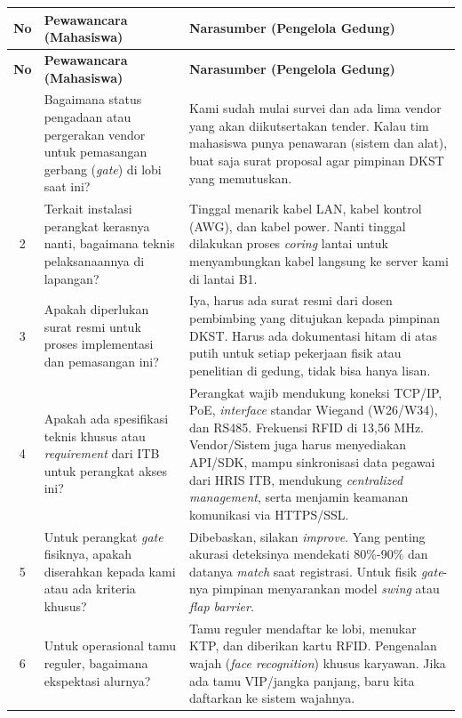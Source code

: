 \begin{longtable}{|c|p{}|p{}|}
\hline
\textbf{No} & \textbf{Pewawancara (Mahasiswa)} & \textbf{Narasumber (Pengelola Gedung)} \\ \hline
\endfirsthead
\hline
\textbf{No} & \textbf{Pewawancara (Mahasiswa)} & \textbf{Narasumber (Pengelola Gedung)} \\ \hline
\endhead
\hline
\endfoot
\hline
\endlastfoot
1 & Bagaimana status pengadaan atau pergerakan vendor untuk pemasangan gerbang (\textit{gate}) di lobi saat ini? & Kami sudah mulai survei dan ada lima vendor yang akan diikutsertakan tender. Kalau tim mahasiswa punya penawaran (sistem dan alat), buat saja surat proposal agar pimpinan DKST yang memutuskan. \\ \hline
2 & Terkait instalasi perangkat kerasnya nanti, bagaimana teknis pelaksanaannya di lapangan? & Tinggal menarik kabel LAN, kabel kontrol (AWG), dan kabel power. Nanti tinggal dilakukan proses \textit{coring} lantai untuk menyambungkan kabel langsung ke server kami di lantai B1. \\ \hline
3 & Apakah diperlukan surat resmi untuk proses implementasi dan pemasangan ini? & Iya, harus ada surat resmi dari dosen pembimbing yang ditujukan kepada pimpinan DKST. Harus ada dokumentasi hitam di atas putih untuk setiap pekerjaan fisik atau penelitian di gedung, tidak bisa hanya lisan. \\ \hline
4 & Apakah ada spesifikasi teknis khusus atau \textit{requirement} dari ITB untuk perangkat akses ini? & Perangkat wajib mendukung koneksi TCP/IP, PoE, \textit{interface} standar Wiegand (W26/W34), dan RS485. Frekuensi RFID di 13,56 MHz. Vendor/Sistem juga harus menyediakan API/SDK, mampu sinkronisasi data pegawai dari HRIS ITB, mendukung \textit{centralized management}, serta menjamin keamanan komunikasi via HTTPS/SSL. \\ \hline
5 & Untuk perangkat \textit{gate} fisiknya, apakah diserahkan kepada kami atau ada kriteria khusus? & Dibebaskan, silakan \textit{improve}. Yang penting akurasi deteksinya mendekati 80\%-90\% dan datanya \textit{match} saat registrasi. Untuk fisik \textit{gate}-nya pimpinan menyarankan model \textit{swing} atau \textit{flap barrier}. \\ \hline
6 & Untuk operasional tamu reguler, bagaimana ekspektasi alurnya? & Tamu reguler mendaftar ke lobi, menukar KTP, dan diberikan kartu RFID. Pengenalan wajah (\textit{face recognition}) khusus karyawan. Jika ada tamu VIP/jangka panjang, baru kita daftarkan ke sistem wajahnya. \\ \hline

\end{longtable}
